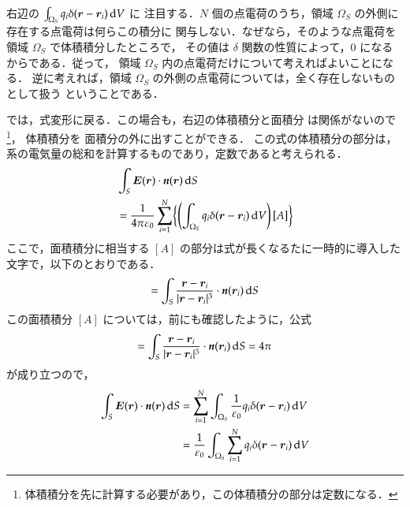             右辺の $\int_{\Omega_{S}}q_{i}\delta(\boldsymbol{r}-\boldsymbol{r}_{i})\,\mathrm{d} V$ に
            注目する．$N$ 個の点電荷のうち，領域 $\Omega_{S}$ の外側に存在する点電荷は何らこの積分に
            関与しない．なぜなら，そのような点電荷を領域 $\Omega_{S}$ で体積積分したところで，
            その値は $\delta$ 関数の性質によって，0 になるからである．従って，
            領域 $\Omega_{S}$ 内の点電荷だけについて考えればよいことになる．
            逆に考えれば，領域 $\Omega_{S}$ の外側の点電荷については，全く存在しないものとして扱う
            ということである．

            では，式変形に戻る．この場合も，右辺の体積積分と面積分 は関係がないので
                \footnote{
                        体積積分を先に計算する必要があり，この体積積分の部分は定数になる．
                }，
            体積積分を
            面積分の外に出すことができる．
            この式の体積積分の部分は，系の電気量の総和を計算するものであり，定数であると考えられる．
            \begin{align*}
                &\int_{S}\boldsymbol{E}(\boldsymbol{r})\cdot\textit{\textbf{n}}(\boldsymbol{r})\,\mathrm{d} S \\
                &=\frac{1}{4\pi\varepsilon_{0}}
                \sum_{i=1}^{N}
                    \biggl\{
                        \left(
                            \int_{\Omega_{S}}q_{i}\delta(\boldsymbol{r}-\boldsymbol{r}_{i})\,\mathrm{d} V
                        \right)
                                                [A]
                     \biggr\}
            \end{align*}
                        ここで，面積積分に相当する $[A]$ の部分は式が長くなるたに一時的に導入した文字で，以下のとおりである．
                                \begin{align}
                            [A] = \int_{S} \frac{\br-\br_{i}}{|\br-\br_{i}|^{3}}
                                          \cdot \textit{\textbf{n}}(\br_{i})\df S
                                \end{align}
            この面積積分 $[A]$ については，前にも確認したように，公式
            \begin{align}
                [A] = \int_{S}
                \frac{\br-\br_{i}}
                {|\br-\br_{i}|^{3}}\cdot\textit{\textbf{n}}(\br_{i})\df S
                =4\pi
            \end{align}
            が成り立つので，
            \begin{align}
                \int_{S}\boldsymbol{E}(\boldsymbol{r})\cdot\textit{\textbf{n}}(\boldsymbol{r})\,\mathrm{d} S
                &=\sum_{i=1}^{N}\int_{\Omega_{S}}\frac{1}{\varepsilon_{0}}
                q_{i}\delta(\boldsymbol{r}-\boldsymbol{r}_{i})\,\mathrm{d} V \notag \\
                &=\frac{1}{\varepsilon_{0}}\int_{\Omega_{S}}\sum_{i=1}^{N}q_{i}
                \delta(\boldsymbol{r}-\boldsymbol{r}_{i})\,\mathrm{d} V
            \end{align}
